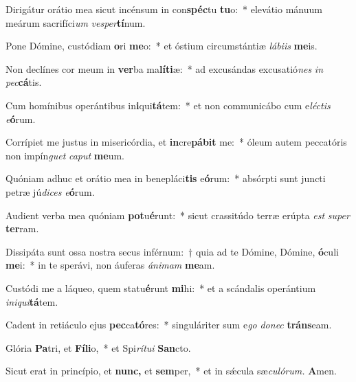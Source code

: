 \item Dirigátur orátio mea sicut incénsum in con\textbf{spéc}tu \textbf{tu}o:~* elevátio mánuum meárum sacrifíci\tinyhspace\textit{um} \textit{vesper}\textbf{tí}num.
\item Pone Dómine, custódiam \textbf{o}ri \textbf{me}o:~* et óstium circumstántiæ \textit{lábiis} \textbf{me}is.
\item Non declínes cor meum in \textbf{ver}ba ma\textbf{lí}\textbf{ti}æ:~* ad excusándas excusatió\teenyhspace\textit{nes} \textit{in} \textit{pec}\textbf{cá}tis.
\item Cum homínibus operántibus in\textbf{i}qui\textbf{tá}tem:~* et non communicábo cum e\tinyhspace\textit{léctis} \textit{e}\textbf{ó}rum.
\item Corrípiet me justus in misericórdia, et \textbf{in}cre\textbf{pá}\textbf{bit} me:~* óleum autem peccatóris non impín\textit{guet} \textit{caput} \textbf{me}um.
\item Quóniam adhuc et orátio mea in benepláci\textbf{tis} e\textbf{ó}rum:~* absórpti sunt juncti petræ jú\tinyhspace\textit{dices} \textit{e}\textbf{ó}rum.
\item Audient verba mea quóniam \textbf{pot}u\textbf{é}runt:~* sicut crassitúdo terræ erúpta \textit{est} \textit{super} \textbf{ter}ram.
\item Dissipáta sunt ossa nostra secus inférnum:~† quia ad te Dómine, Dómine, \textbf{ó}culi \textbf{me}i:~* in te sperávi, non áuferas \textit{ánimam} \textbf{me}am.
\item Custódi me a láqueo, quem statu\textbf{é}runt \textbf{mi}hi:~* et a scándalis operántium \textit{iniqui}\textbf{tá}tem.
\item Cadent in retiáculo ejus \textbf{pec}ca\textbf{tó}res:~* singuláriter sum e\textit{go} \textit{donec} \textbf{tráns}eam.
\item Glória \textbf{Pa}tri, et \textbf{Fí}\textbf{li}o,~* et Spi\tinyhspace\textit{rítui} \textbf{San}cto.
\item Sicut erat in princípio, et \textbf{nunc,} et \textbf{sem}per,~* et in sǽcula sæ\tinyhspace\textit{culórum.} \textbf{A}men.